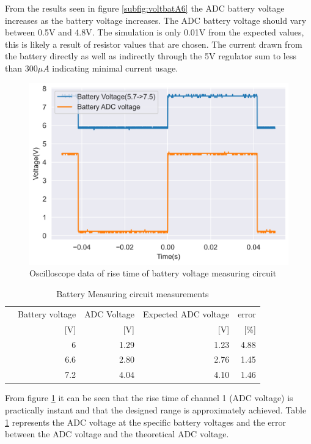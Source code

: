 From the results seen in figure \ref{subfig:voltbatA6} the ADC battery voltage increases as the battery voltage increases. The ADC battery voltage should vary between 0.5V and 4.8V. The simulation is only 0.01V from the expected values, this is likely a result of resistor values that are chosen. The current drawn from the battery directly as well as indirectly through the 5V regulator sum to less than $300\mu A$ indicating minimal current usage.




\begin{figure}[!htb]
	\centering
	\includegraphics[scale=0.45]{./Figures/A6/batmeas.png}
	\caption{Oscilloscope data of rise time of battery voltage measuring circuit}
	\label{fig:batrise}
\end{figure}



\begin{table}[!htb]
	\centering
	\footnotesize
	\caption{Battery Measuring circuit measurements}
	\begin{tabular}{lrrrr}
		\toprule
		&Battery voltage& ADC Voltage&Expected ADC voltage& error \\
		&  [V]&[V]&[V]&[\%] \\
		\midrule
		&6&1.29&1.23  &4.88   \\
		&6.6&2.80&2.76  &1.45   \\
		&7.2&4.04&4.10   &1.46  \\
		\bottomrule
	\end{tabular}
	\label{tab:batmeas}
\end{table}


From figure \ref{fig:batrise} it can be seen that the rise time of channel 1 (ADC voltage) is practically instant and that the designed range is approximately achieved. Table \ref{tab:batmeas} represents the ADC voltage at the specific battery voltages and the error between the ADC voltage and the theoretical ADC voltage.








